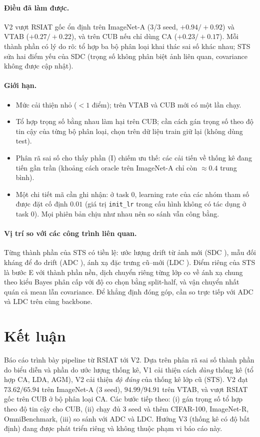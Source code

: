 \documentclass[11pt]{article}
\begin{document}
\paragraph{Điều đã làm được.} V2 vượt RSIAT gốc ổn định trên ImageNet-A (3/3 seed, $+0.94/+0.92$) và VTAB
($+0.27/+0.22$), và trên CUB nếu chỉ dùng CA ($+0.23/+0.17$). Mỗi thành phần có lý do rõ: tổ hợp ba bộ phân loại khai
thác sai số khác nhau; STS sửa hai điểm yếu của SDC (trọng số không phân biệt ảnh liên quan, covariance không được cập
nhật).

\paragraph{Giới hạn.}
\begin{itemize}
\item Mức cải thiện nhỏ ($<1$ điểm); trên VTAB và CUB mới có một lần chạy.
\item Tổ hợp trọng số bằng nhau làm hại trên CUB; cần cách gán trọng số theo độ tin cậy của từng bộ phân loại, chọn
      trên dữ liệu train giữ lại (không dùng test).
\item Phân rã sai số cho thấy phần (I) chiếm ưu thế: các cải tiến về thống kê đang tiến gần trần (khoảng cách oracle
      trên ImageNet-A chỉ còn $\approx0.4$ trung bình).
\item Một chi tiết mã cần ghi nhận: ở task 0, learning rate của các nhóm tham số được đặt cố định $0.01$ (giá trị
      \texttt{init\_lr} trong cấu hình không có tác dụng ở task 0). Mọi phiên bản chịu như nhau nên so sánh vẫn công bằng.
\end{itemize}

\paragraph{Vị trí so với các công trình liên quan.} Từng thành phần của STS có tiền lệ: ước lượng drift từ ảnh mới
(SDC \cite{sdc}), mẫu đối kháng để đo drift (ADC \cite{adc}), ánh xạ đặc trưng cũ--mới (LDC \cite{ldc}). Điểm riêng của
STS là bước E với thành phần nền, dịch chuyển riêng từng lớp co về ánh xạ chung theo kiểu Bayes phân cấp với độ co chọn
bằng split-half, và vận chuyển nhất quán cả mean lẫn covariance. Để khẳng định đóng góp, cần so trực tiếp với ADC và LDC
trên cùng backbone.

\section{Kết luận}
Báo cáo trình bày pipeline từ RSIAT tới V2. Dựa trên phân rã sai số thành phần do biểu diễn và phần do ước lượng thống
kê, V1 cải thiện cách \emph{dùng} thống kê (tổ hợp CA, LDA, AGM), V2 cải thiện \emph{độ đúng} của thống kê lớp cũ (STS).
V2 đạt $73.62/65.94$ trên ImageNet-A (3 seed), $94.99/94.91$ trên VTAB, và vượt RSIAT gốc trên CUB ở bộ phân loại CA.
Các bước tiếp theo: (i) gán trọng số tổ hợp theo độ tin cậy cho CUB, (ii) chạy đủ 3 seed và thêm CIFAR-100, ImageNet-R,
OmniBenchmark, (iii) so sánh với ADC và LDC. Hướng V3 (thống kê có độ bất định) đang được phát triển riêng và không
thuộc phạm vi báo cáo này.
\end{document}
